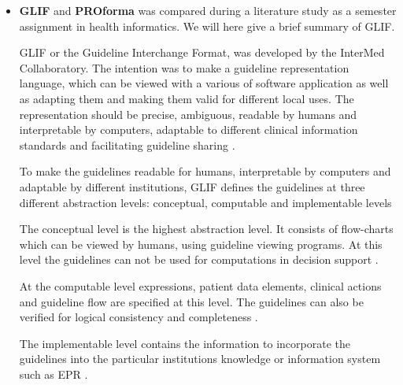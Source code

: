 \begin{itemize}
	\item \textbf{GLIF} and \textbf{PROforma} was compared during a literature study as a semester assignment in health informatics. We will here give a brief summary of GLIF.
	
	 GLIF or the Guideline Interchange Format, was developed by the InterMed Collaboratory. The intention was to make a guideline representation language, which can be viewed with a various of software application as well as adapting them and making them valid for different local uses. The representation should be precise, ambiguous, readable by humans and interpretable by computers, adaptable to different clinical information standards and facilitating guideline sharing \parencite{Peleg2000}. 

	To make the guidelines readable for humans, interpretable by computers and adaptable by different institutions, GLIF defines the guidelines at three different abstraction levels: conceptual, computable and implementable levels \parencite{DeClercq2008} 
	
	The conceptual level is the highest abstraction level. It consists of
flow-charts which can be viewed by humans, using guideline viewing programs. At this level the guidelines can not
	be used for computations in decision support \parencite{Peleg2000}. 
	
	At the computable level expressions, patient data elements, clinical actions and guideline flow
	are specified at this level. The guidelines can also be verified for logical consistency and completeness \parencite{Peleg2000}.
	
	The implementable level contains the information to incorporate the guidelines into
	the particular institutions knowledge or information system such as EPR \parencite{Peleg2000}.
	

\end{itemize}
